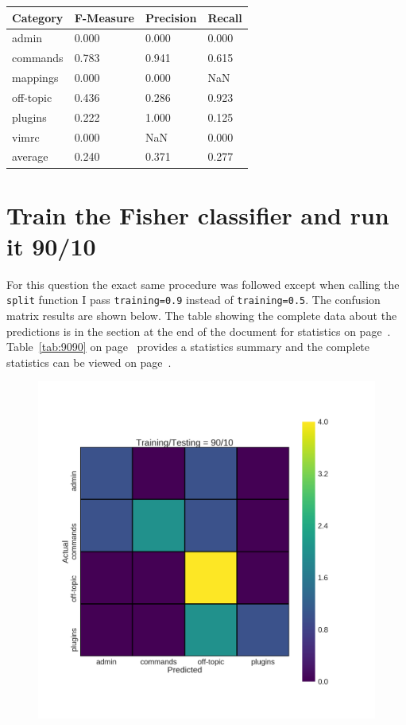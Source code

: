\documentclass[12pt, a4paper]{article}
\newcommand{\code}[1]{\texttt{#1}}
\begin{document}
\begin{table}[H]
    \centering
    \label{tab:5050}
    \begin{tabular}{llll}
    \hline
    Category    & F-Measure & Precision & Recall    \\
    \hline
    admin       & 0.000     & 0.000     & 0.000     \\
    commands    & 0.783     & 0.941     & 0.615     \\
    mappings    & 0.000     & 0.000     & NaN       \\
    off-topic   & 0.436     & 0.286     & 0.923     \\
    plugins     & 0.222     & 1.000     & 0.125     \\
    vimrc       & 0.000     & NaN       & 0.000     \\
    average     & 0.240     & 0.371     & 0.277     \\
    \hline
    \end{tabular}
\end{table}

\newpage
\section{Train the Fisher classifier and run it 90/10}

For this question the exact same procedure was followed except when calling the \code{split} function I pass \code{training=0.9} instead of \code{training=0.5}. The confusion matrix results are shown below. The table showing the complete data about the predictions is in the section at the end of the document for statistics on page~\pageref{sec:9090}. Table~\ref{tab:9090} on page~\pageref{tab:9090} provides a statistics summary and the complete statistics can be viewed on page~\pageref{9090stats}.


\begin{figure}[H]
    \label{fig:9090}
    \includegraphics[width=\textwidth]{../train_validate/heatmaps/90_10.png}
\end{figure}
\end{document}

